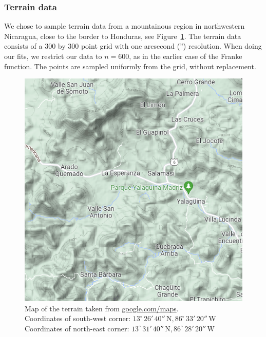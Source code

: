 \documentclass[twocolumn,english,notitlepage]{article}
\begin{document}
        \subsubsection*{Terrain data}
            We chose to sample terrain data from a mountainous region in northwestern Nicaragua, close to the border to Honduras, see Figure~\ref{met:fig:gmaps}.
            The terrain data consists of a 300 by 300 point grid with one arcsecond ('') resolution. When doing our fits, we restrict our data to $n=600$, as in the earlier case of the Franke function. The points are sampled uniformly from the grid, without replacement. 
            \begin{figure} [ht]
                \centering
                \includegraphics[width=.9\linewidth]{Nica_gmaps.PNG}
                \caption{Map of the terrain taken from \url{google.com/maps}. \\
                Coordinates of south-west corner: $13^\circ\,26'\,40''\,\text{N}, 86^\circ\,33'\,20''\,\text{W}$ \\
                Coordinates of north-east corner: $13^\circ\,31'\,40''\,\text{N}, 86^\circ\,28'\,20''\,\text{W}$}
                \label{met:fig:gmaps}
            \end{figure}
            
\end{document}
